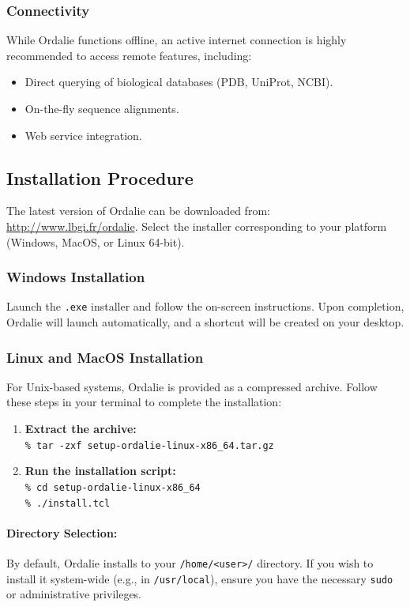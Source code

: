 \documentclass[a4paper]{article}
\begin{document}
\subsubsection{Connectivity}
While Ordalie functions offline, an active internet connection is highly recommended to access remote features, including:
\begin{itemize}
    \item Direct querying of biological databases (PDB, UniProt, NCBI).
    \item On-the-fly sequence alignments.
    \item Web service integration.
\end{itemize}

\subsection{Installation Procedure}
The latest version of Ordalie can be downloaded from: \url{http://www.lbgi.fr/ordalie}. Select the installer corresponding to your platform (Windows, MacOS, or Linux 64-bit).

\subsubsection{Windows Installation}
Launch the \texttt{.exe} installer and follow the on-screen instructions. Upon completion, Ordalie will launch automatically, and a shortcut will be created on your desktop.

\subsubsection{Linux and MacOS Installation}
For Unix-based systems, Ordalie is provided as a compressed archive. Follow these steps in your terminal to complete the installation:

\begin{enumerate}
    \item \textbf{Extract the archive:} \\
    \texttt{\% tar -zxf setup-ordalie-linux-x86\_64.tar.gz}
    \item \textbf{Run the installation script:} \\
    \texttt{\% cd setup-ordalie-linux-x86\_64} \\
    \texttt{\% ./install.tcl}
\end{enumerate}

\paragraph{Directory Selection:} By default, Ordalie installs to your \texttt{/home/<user>/} directory. If you wish to install it system-wide (e.g., in \texttt{/usr/local}), ensure you have the necessary \texttt{sudo} or administrative privileges.
\end{document}
